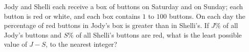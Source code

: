 Jody and Shelli each receive a box of buttons on Saturday and on Sunday; each button is red or white, and each box contains $1$ to $100$ buttons. On each day the percentage of red buttons in Jody's box is greater than in Shelli's. If $J\%$ of all Jody's buttons and $S\%$ of all Shelli's buttons are red, what is the least possible value of $J-S$, to the nearest integer?
